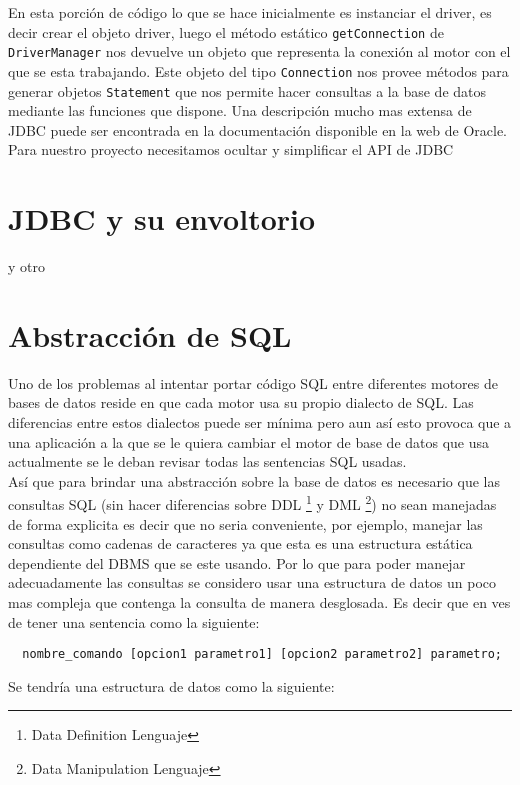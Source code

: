 En esta porción de código lo que se hace inicialmente es instanciar el driver, es decir crear el objeto driver, luego el método estático \verb=getConnection= de 	\verb=DriverManager= nos devuelve un objeto que representa la conexión al motor con el que se esta trabajando. Este objeto del tipo \verb=Connection= nos provee métodos para generar objetos \verb=Statement= que nos permite hacer consultas a la base de datos mediante las funciones que dispone. Una descripción mucho mas extensa de JDBC puede ser encontrada en la documentación disponible en la web de Oracle\citep{java:jdbc}.
Para nuestro proyecto necesitamos ocultar y simplificar el API de JDBC





\section{JDBC y su envoltorio}
y otro






\section{Abstracción de SQL}
Uno de los problemas al intentar portar código SQL entre diferentes motores de bases de datos reside en que cada motor usa su propio dialecto de SQL. Las diferencias entre estos dialectos puede ser mínima pero aun así esto provoca que a una aplicación a la que se le quiera cambiar el motor de base de datos que usa actualmente se le deban revisar todas las sentencias SQL usadas.\\
Así que para brindar una abstracción sobre la base de datos es necesario que las consultas SQL (sin hacer diferencias sobre DDL \footnote{Data Definition Lenguaje} y DML \footnote{Data Manipulation Lenguaje}) no sean manejadas de forma explicita es decir que no seria conveniente, por ejemplo, manejar las consultas como cadenas de caracteres ya que esta es una estructura estática dependiente del DBMS que se este usando. Por lo que para poder manejar adecuadamente las consultas se considero usar una estructura de datos un poco mas compleja que contenga la consulta de manera desglosada. Es decir que en ves de tener una sentencia como la siguiente:
\begin{Verbatim}
  nombre_comando [opcion1 parametro1] [opcion2 parametro2] parametro; 
\end{Verbatim}

Se tendría una estructura de datos como la siguiente:


